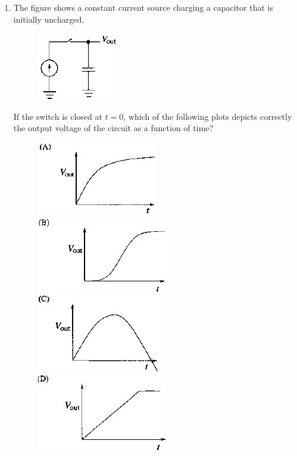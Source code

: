 \documentclass[journal,12pt,onecolumn]{IEEEtran}
\theoremstyle{remark}
\begin{document}
\begin{enumerate}
\item The figure shows a constant current source charging a capacitor that is initially uncharged.
	\begin{figure}[H] \centering
		\caption*{} \label{40} \includegraphics[width=0.3\columnwidth]{figs/40.png}
	\end{figure}
	If the switch is closed at $t=0$, which of the following plots depicts correctly the output voltage of the circuit as a function of time?\hfill{}
	\begin{figure}[H]
		\centering
		\caption*{} \label{40a} \includegraphics[width=0.45\columnwidth]{figs/40a.png}
		\caption*{} \label{40b} \includegraphics[width=0.45\columnwidth]{figs/40b.png}
		\caption*{} \label{40c} \includegraphics[width=0.45\columnwidth]{figs/40c.png}
		\caption*{} \label{40d} \includegraphics[width=0.45\columnwidth]{figs/40d.png}
	\end{figure}



\end{enumerate}
\end{document}
